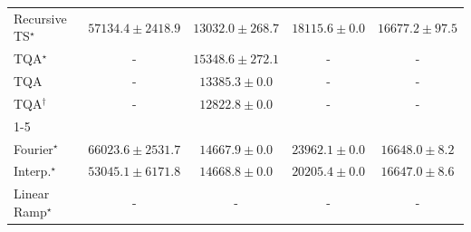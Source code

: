 \begin{tabular}{l|cccc|}
Recursive TS$^\star$ & {\cellcolor[HTML]{A43904}} \color[HTML]{F1F1F1} $57134.4\pm 2418.9$ & {\cellcolor[HTML]{FFFACA}} \color[HTML]{000000} $13032.0\pm 268.7$ & {\cellcolor[HTML]{FFEFAC}} \color[HTML]{000000} $18115.6\pm 0.0$ & {\cellcolor[HTML]{FFF3B4}} \color[HTML]{000000} $16677.2\pm 97.5$ \\
TQA$^\star$ & {\cellcolor[HTML]{000000}} \color[HTML]{F1F1F1} {\cellcolor{white}} \color{black} - & {\cellcolor[HTML]{FFF7BC}} \color[HTML]{000000} $15348.6\pm 272.1$ & {\cellcolor[HTML]{000000}} \color[HTML]{F1F1F1} {\cellcolor{white}} \color{black} - & {\cellcolor[HTML]{000000}} \color[HTML]{F1F1F1} {\cellcolor{white}} \color{black} - \\
TQA & {\cellcolor[HTML]{000000}} \color[HTML]{F1F1F1} {\cellcolor{white}} \color{black} - & {\cellcolor[HTML]{FFF9C7}} \color[HTML]{000000} $13385.3\pm 0.0$ & {\cellcolor[HTML]{000000}} \color[HTML]{F1F1F1} {\cellcolor{white}} \color{black} - & {\cellcolor[HTML]{000000}} \color[HTML]{F1F1F1} {\cellcolor{white}} \color{black} - \\
TQA$^\dagger$ & {\cellcolor[HTML]{000000}} \color[HTML]{F1F1F1} {\cellcolor{white}} \color{black} - & {\cellcolor[HTML]{FFFACA}} \color[HTML]{000000} $12822.8\pm 0.0$ & {\cellcolor[HTML]{000000}} \color[HTML]{F1F1F1} {\cellcolor{white}} \color{black} - & {\cellcolor[HTML]{000000}} \color[HTML]{F1F1F1} {\cellcolor{white}} \color{black} - \\
\cline{1-5}
\multicolumn{5}{c}{\rule{0pt}{8pt}PP} \\
\midrule
Fourier$^\star$ & {\cellcolor[HTML]{004529}} \color[HTML]{F1F1F1} $66023.6\pm 2531.7$ & {\cellcolor[HTML]{F8FCBD}} \color[HTML]{000000} $14667.9\pm 0.0$ & {\cellcolor[HTML]{D0EC9F}} \color[HTML]{000000} $23962.1\pm 0.0$ & {\cellcolor[HTML]{F2FAB5}} \color[HTML]{000000} $16648.0\pm 8.2$ \\
Interp.$^\star$ & {\cellcolor[HTML]{1C7E40}} \color[HTML]{F1F1F1} $53045.1\pm 6171.8$ & {\cellcolor[HTML]{F8FCBD}} \color[HTML]{000000} $14668.8\pm 0.0$ & {\cellcolor[HTML]{E3F4AA}} \color[HTML]{000000} $20205.4\pm 0.0$ & {\cellcolor[HTML]{F2FAB5}} \color[HTML]{000000} $16647.0\pm 8.6$ \\
Linear Ramp$^\star$ & {\cellcolor[HTML]{000000}} \color[HTML]{F1F1F1} {\cellcolor{white}} \color{black} - & {\cellcolor[HTML]{000000}} \color[HTML]{F1F1F1} {\cellcolor{white}} \color{black} - & {\cellcolor[HTML]{000000}} \color[HTML]{F1F1F1} {\cellcolor{white}} \color{black} - & {\cellcolor[HTML]{000000}} \color[HTML]{F1F1F1} {\cellcolor{white}} \color{black} - \\

\end{tabular}
